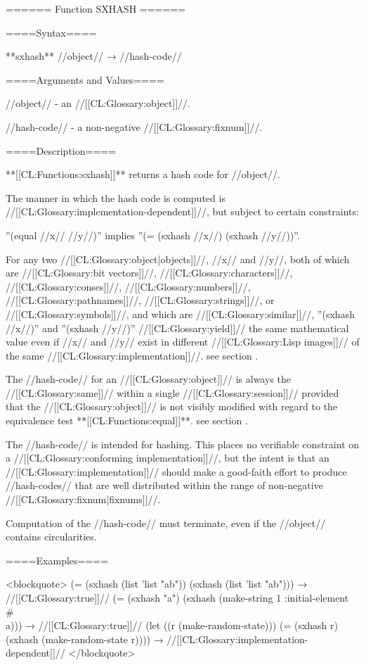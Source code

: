 ====== Function SXHASH ======

====Syntax====

**sxhash** //object// → //hash-code//

====Arguments and Values====

//object// - an //[[CL:Glossary:object]]//.

//hash-code// - a non-negative //[[CL:Glossary:fixnum]]//.

====Description====

**[[CL:Functions:sxhash]]** returns a hash code for //object//.

The manner in which the hash code is computed is //[[CL:Glossary:implementation-dependent]]//, but subject to certain constraints:

\beginlist {} ''(equal //x// //y//)'' implies ''(= (sxhash //x//) (sxhash //y//))''.

 For any two //[[CL:Glossary:object|objects]]//, //x// and //y//, both of which are //[[CL:Glossary:bit vectors]]//, //[[CL:Glossary:characters]]//, //[[CL:Glossary:conses]]//, //[[CL:Glossary:numbers]]//, //[[CL:Glossary:pathnames]]//, //[[CL:Glossary:strings]]//, or //[[CL:Glossary:symbols]]//, and which are //[[CL:Glossary:similar]]//, ''(sxhash //x//)'' and ''(sxhash //y//)'' //[[CL:Glossary:yield]]// the same mathematical value even if //x// and //y// exist in different //[[CL:Glossary:Lisp images]]// of the same //[[CL:Glossary:implementation]]//. see section {\secref\LiteralsInCompiledFiles}.

 The //hash-code// for an //[[CL:Glossary:object]]// is always the //[[CL:Glossary:same]]// within a single //[[CL:Glossary:session]]// provided that the //[[CL:Glossary:object]]// is not visibly modified with regard to the equivalence test **[[CL:Functions:equal]]**. see section {\secref\ModifyingHashKeys}.

 The //hash-code// is intended for hashing. This places no verifiable constraint on a //[[CL:Glossary:conforming implementation]]//, but the intent is that an //[[CL:Glossary:implementation]]// should make a good-faith effort to produce //hash-codes// that are well distributed within the range of non-negative //[[CL:Glossary:fixnum|fixnums]]//.

 Computation of the //hash-code// must terminate, even if the //object// contains circularities. \endlist

====Examples====

<blockquote> (= (sxhash (list 'list "ab")) (sxhash (list 'list "ab"))) → //[[CL:Glossary:true]]// (= (sxhash "a") (sxhash (make-string 1 :initial-element #\\a))) → //[[CL:Glossary:true]]// (let ((r (make-random-state))) (= (sxhash r) (sxhash (make-random-state r)))) → //[[CL:Glossary:implementation-dependent]]// </blockquote>

